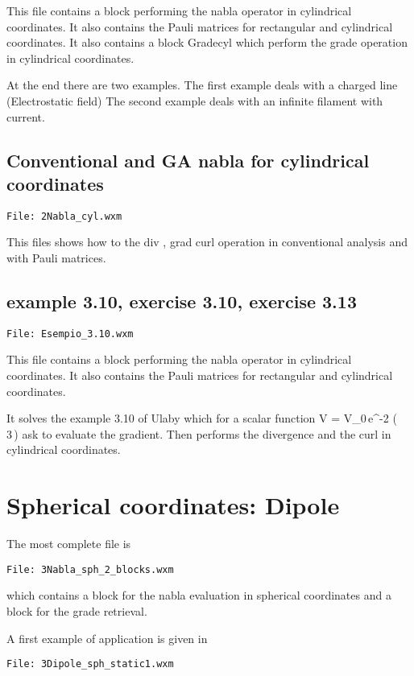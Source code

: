\documentclass[]{article}
\begin{document}
This file contains a block performing the nabla operator in cylindrical coordinates.
It also contains the Pauli matrices for rectangular and cylindrical coordinates.
It also contains a block Gradecyl which perform the grade operation in cylindrical coordinates.

At the end there are two examples. 
The first example deals with a charged line (Electrostatic field)
The second example deals with an infinite filament with current.

\subsection{Conventional and GA nabla for cylindrical coordinates}
\begin{verbatim}
File: 2Nabla_cyl.wxm
\end{verbatim}

This files shows how to the div , grad curl operation in conventional analysis and with Pauli matrices.



\subsection{example 3.10, exercise 3.10, exercise 3.13}
\begin{verbatim}
File: Esempio_3.10.wxm
\end{verbatim}

This file contains a block performing the nabla operator in cylindrical coordinates.
It also contains the Pauli matrices for rectangular and cylindrical coordinates.

It solves the example 3.10 of Ulaby which for a scalar function
\be
V = {V}_{0}\,{e}^{-2\,\rho}\,\left( 3\,\phi\right) 
\ee
ask to evaluate the gradient.
Then performs the divergence and the curl in cylindrical coordinates.


\section{Spherical coordinates: Dipole}

The most complete file is 
\begin{verbatim}
File: 3Nabla_sph_2_blocks.wxm
\end{verbatim}
which contains a block for the nabla evaluation in spherical coordinates and a block for the grade retrieval.


A first example of application is given in 
\begin{verbatim}
File: 3Dipole_sph_static1.wxm
\end{verbatim}
\end{document}
